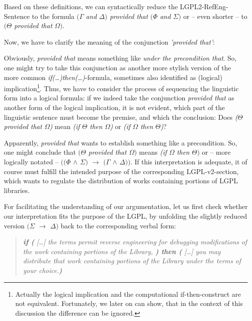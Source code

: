 Based on these definitions, we can syntactically reduce the
LGPL2-RefEng-Sentence to the formula \emph{$(\Gamma$ and $\Delta)$ provided that
$(\Phi$ and $\Sigma)$} or -- even shorter -- to \emph{$(\Theta$ provided that
$\Omega)$}.

Now, we have to clarify the meaning of the conjunction \emph{'provided that'}:

Obviously, \emph{provided that} means something like \emph{under the
precondition that}. So, one might try to take this conjunction as another more
stylish version of the more common \emph{if(\ldots)then(\ldots)}-formula,
sometimes also identified as (logical) implication\footnote{Actually the logical
implication and the computational if-then-construct are not equivalent.
Fortunately, we later on can show, that in the context of this discussion the
difference can be ignored.}. Thus, we have to consider the process of sequencing
the linguistic form into a logical formula: if we indeed take the conjunction
\emph{provided that} as another form of the logical implication, it is not
evident, which part of the linguistic sentence must become the premise, and
which the conclusion: Does \emph{($\Theta$ provided that $\Omega$)} mean
\emph{(if $\Theta$ then $\Omega$)} or \emph{(if $\Omega$ then $\Theta$)}?

Apparently, \emph{provided that} wants to establish something like a
precondition. So, one might conclude that \emph{$(\Theta$ provided that
$\Omega)$} means \emph{(if $\Omega$ then $\Theta)$} or -- more logically notated
-- \emph{$((\Phi$ $\wedge$ $\Sigma)$ $\rightarrow$ $(\Gamma$ $\wedge$
$\Delta))$}. If this interpretation is adequate, it of course must fulfill the
intended purpose of the corresponding LGPL-v2-section, which wants to regulate
the distribution of works containing portions of LGPL libraries.

For facilitating the understanding of our argumentation, let us first check
whether our interpretation fits the purpose of the LGPL, by unfolding the
slightly reduced version \emph{$(\Sigma$ $\rightarrow$ $\Delta)$} back to the
corresponding verbal form:

\begin{quote}\noindent\emph{\textbf{if (} [\ldots] the terms permit reverse
engineering for debugging modifications of the work containing portions of the
Library, \textbf{) then (} [\ldots] you may distribute that work containing
portions of the Library under the terms of your choice.\textbf{)}}\end{quote}

